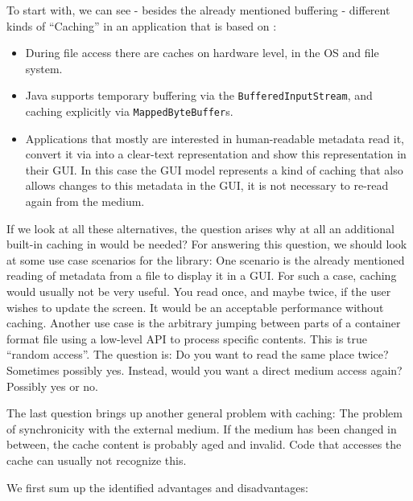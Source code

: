 To start with, we can see - besides the already mentioned buffering - different kinds of ``Caching'' in an application that is based on \LibName{}:
\begin{itemize}
	\item During file access there are caches on hardware level, in the OS and file system.
	\item Java supports temporary buffering via the \texttt{BufferedInputStream}, and caching explicitly via \texttt{MappedByteBuffer}s.
	\item Applications that mostly are interested in human-readable metadata read it, convert it via \LibName{} into a clear-text representation and show this representation in their GUI. In this case the GUI model represents a kind of caching that also allows changes to this metadata in the GUI, it is not necessary to re-read again from the medium.
\end{itemize}

If we look at all these alternatives, the question arises why at all an additional built-in caching in \LibName{} would be needed? For answering this question, we should look at some use case scenarios for the library: One scenario is the already mentioned reading of metadata from a file to display it in a GUI. For such a case, caching would usually not be very useful. You read once, and maybe twice, if the user wishes to update the screen. It would be an acceptable performance without caching. Another use case is the arbitrary jumping between parts of a container format file using a low-level API to process specific contents. This is true ``random access''. The question is: Do you want to read the same place twice? Sometimes possibly yes. Instead, would you want a direct medium access again? Possibly yes or no.

The last question brings up another general problem with caching: The problem of synchronicity with the external medium. If the medium has been changed in between, the cache content is probably aged and invalid. Code that accesses the cache can usually not recognize this.

We first sum up the identified advantages and disadvantages:

